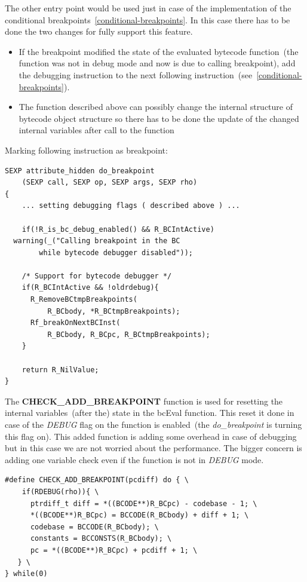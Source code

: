 \documentclass[thesis=M,english]{FITthesis}[2018/10/20]
\begin{document}
The other entry point would be used just in case of the implementation of the conditional breakpoints~\ref{conditional-breakpoints}. In this case there has to be done the two changes for fully support this feature.

\begin{itemize}
	\item If the breakpoint modified the state of the evaluated bytecode function~(the function was not in debug mode and now is due to calling breakpoint), add the debugging instruction to the next following instruction~(see~\ref{conditional-breakpoints}).
	\item The function described above can possibly change the internal structure of bytecode object structure so there has to be done the update of the changed internal variables after call to the function
\end{itemize}


Marking following instruction as breakpoint:
\begin{lstlisting}
SEXP attribute_hidden do_breakpoint
	(SEXP call, SEXP op, SEXP args, SEXP rho)
{
	... setting debugging flags ( described above ) ...

    if(!R_is_bc_debug_enabled() && R_BCIntActive)
  warning(_("Calling breakpoint in the BC 
  		while bytecode debugger disabled"));

    /* Support for bytecode debugger */
    if(R_BCIntActive && !oldrdebug){
      R_RemoveBCtmpBreakpoints(
          R_BCbody, *R_BCtmpBreakpoints);
      Rf_breakOnNextBCInst(
          R_BCbody, R_BCpc, R_BCtmpBreakpoints);
    }

    return R_NilValue;
}
\end{lstlisting}

The \textbf{CHECK{\_}ADD{\_}BREAKPOINT} function is used for resetting the internal variables~(after the) state in the bcEval function. This reset it done in case of the \textit{DEBUG} flag on the function is enabled~(the \textit{do{\_}breakpoint} is turning this flag on). This added function is adding some overhead in case of debugging but in this case we are not worried about the performance. The bigger concern is adding one variable check even if the function is not in \textit{DEBUG} mode.
\begin{lstlisting}
#define CHECK_ADD_BREAKPOINT(pcdiff) do { \
    if(RDEBUG(rho)){ \
      ptrdiff_t diff = *((BCODE**)R_BCpc) - codebase - 1; \
      *((BCODE**)R_BCpc) = BCCODE(R_BCbody) + diff + 1; \
      codebase = BCCODE(R_BCbody); \
      constants = BCCONSTS(R_BCbody); \
      pc = *((BCODE**)R_BCpc) + pcdiff + 1; \
   } \
} while(0)
\end{lstlisting}
\end{document}
